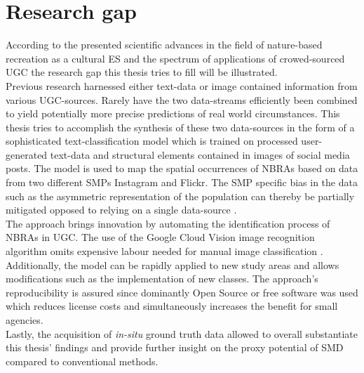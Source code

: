 
\section{Research gap}
According to the presented scientific advances in the field of nature-based recreation as a cultural ES and the spectrum of applications of crowed-sourced UGC the research gap this thesis tries to fill will be illustrated. \\
Previous research harnessed either text-data \parencite{Barchiesi2015, Monkman2018, Wartmann2018} or image contained information \parencite{Richards2018, Heikinheimo2017} from various UGC-sources. Rarely have the two data-streams efficiently been combined to yield potentially more precise predictions of real world circumstances. This thesis tries to accomplish the synthesis of these two data-sources in the form of a sophisticated text-classification model which is trained on processed user-generated text-data and structural elements contained in images of social media posts. The model is used to map the spatial occurrences of NBRAs based on data from two different SMPs Instagram and Flickr. The SMP specific bias in the data such as the asymmetric representation of the population can thereby be partially mitigated opposed to relying on a single data-source \parencite{Barchiesi2015, Grossenbacher2014, Monkman2018, Mancini2018}. \\
The approach brings innovation by automating the identification process of NBRAs in UGC. The use of the Google Cloud Vision image recognition algorithm omits expensive labour needed for manual image classification \parencite{Richards2018}. Additionally, the model can be rapidly applied to new study areas and allows modifications such as the implementation of new classes. The approach's reproducibility is assured since dominantly Open Source or free software was used which reduces license costs and simultaneously increases the benefit for small agencies. \\
Lastly, the acquisition of \textit{in-situ} ground truth data allowed to overall substantiate this thesis' findings and provide further insight on the proxy potential of SMD compared to conventional methods. 

 